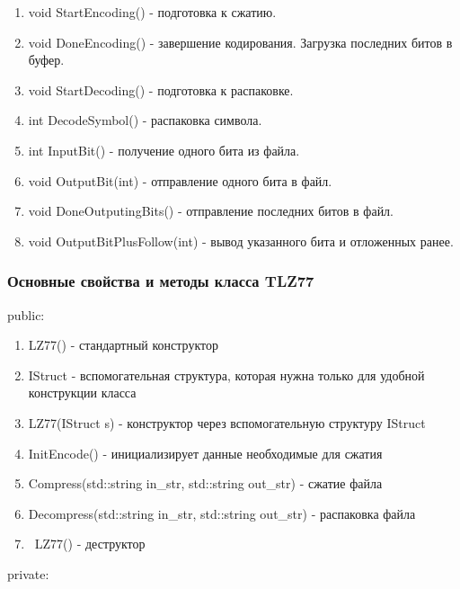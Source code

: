 \documentclass[12pt]{article}
\begin{document}
\begin{enumerate}
	\item void StartEncoding() - подготовка к сжатию.
	\item void DoneEncoding() - завершение кодирования. Загрузка последних битов в буфер.
	\item void StartDecoding() - подготовка к распаковке.
	\item int DecodeSymbol() - распаковка символа.
	\item int InputBit() - получение одного бита из файла.
	\item void OutputBit(int) - отправление одного бита в файл.
	\item void DoneOutputingBits() - отправление последних битов в файл.
	\item void OutputBitPlusFollow(int) - вывод указанного бита и отложенных ранее.
\end{enumerate}

\subsubsection*{Основные свойства и методы класса TLZ77}
\noindent
public:

\begin{enumerate}
    \item LZ77() - стандартный конструктор
    \item IStruct - вспомогательная структура, которая нужна только для удобной конструкции класса
    \item LZ77(IStruct s) - конструктор через вспомогательную структуру IStruct
	\item InitEncode() - инициализирует данные необходимые для сжатия
	\item Compress(std::string in\_str, std::string out\_str) - сжатие файла 
	\item Decompress(std::string in\_str, std::string out\_str) -  распаковка файла
	\item ~LZ77() - деструктор
\end{enumerate}
\noindent
private:
\end{document}
